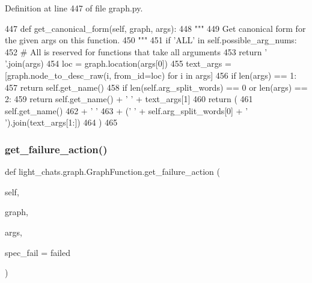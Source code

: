 Definition at line 447 of file graph.\+py.


\begin{DoxyCode}
447     \textcolor{keyword}{def }get\_canonical\_form(self, graph, args):
448         \textcolor{stringliteral}{"""}
449 \textcolor{stringliteral}{        Get canonical form for the given args on this function.}
450 \textcolor{stringliteral}{        """}
451         \textcolor{keywordflow}{if} \textcolor{stringliteral}{'ALL'} \textcolor{keywordflow}{in} self.possible\_arg\_nums:
452             \textcolor{comment}{# All is reserved for functions that take all arguments}
453             \textcolor{keywordflow}{return} \textcolor{stringliteral}{' '}.join(args)
454         loc = graph.location(args[0])
455         text\_args = [graph.node\_to\_desc\_raw(i, from\_id=loc) \textcolor{keywordflow}{for} i \textcolor{keywordflow}{in} args]
456         \textcolor{keywordflow}{if} len(args) == 1:
457             \textcolor{keywordflow}{return} self.get\_name()
458         \textcolor{keywordflow}{if} len(self.arg\_split\_words) == 0 \textcolor{keywordflow}{or} len(args) == 2:
459             \textcolor{keywordflow}{return} self.get\_name() + \textcolor{stringliteral}{' '} + text\_args[1]
460         \textcolor{keywordflow}{return} (
461             self.get\_name()
462             + \textcolor{stringliteral}{' '}
463             + (\textcolor{stringliteral}{' '} + self.arg\_split\_words[0] + \textcolor{stringliteral}{' '}).join(text\_args[1:])
464         )
465 
\end{DoxyCode}
\mbox{\label{classlight__chats_1_1graph_1_1GraphFunction_ab20674b5c6c05a6c5188e51bc991717f}} 
\subsubsection{\texorpdfstring{get\+\_\+failure\+\_\+action()}{get\_failure\_action()}}
{\footnotesize\ttfamily def light\+\_\+chats.\+graph.\+Graph\+Function.\+get\+\_\+failure\+\_\+action (\begin{DoxyParamCaption}\item[{}]{self,  }\item[{}]{graph,  }\item[{}]{args,  }\item[{}]{spec\+\_\+fail = {\ttfamily \textquotesingle{}failed\textquotesingle{}} }\end{DoxyParamCaption})}

